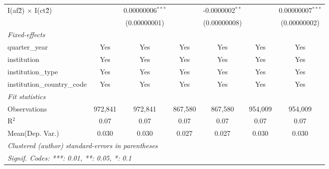 \begin{tabular}{lcccccc}
   I(af\^2) $\times$ I(ct\^2)         &               & 0.00000006$^{***}$ &                & -0.0000002$^{**}$ &               & 0.00000007$^{***}$\\   
                                      &               & (0.00000001)       &                & (0.00000008)      &               & (0.00000002)\\   
   \midrule
   \emph{Fixed-effects}\\
   quarter\_year                      & Yes           & Yes                & Yes            & Yes               & Yes           & Yes\\  
   institution                        & Yes           & Yes                & Yes            & Yes               & Yes           & Yes\\  
   institution\_type                  & Yes           & Yes                & Yes            & Yes               & Yes           & Yes\\  
   institution\_country\_code         & Yes           & Yes                & Yes            & Yes               & Yes           & Yes\\  
   \midrule
   \emph{Fit statistics}\\
   Observations                       & 972,841       & 972,841            & 867,580        & 867,580           & 954,009       & 954,009\\  
   R$^2$                              & 0.07          & 0.07               & 0.07           & 0.07              & 0.07          & 0.07\\  
Mean(Dep. Var.) & 0.030 & 0.030 & 0.027 & 0.027 & 0.030 & 0.030 \\
   \midrule \midrule
   \multicolumn{7}{l}{\emph{Clustered (author) standard-errors in parentheses}}\\
   \multicolumn{7}{l}{\emph{Signif. Codes: ***: 0.01, **: 0.05, *: 0.1}}\\
\end{tabular}
\par\endgroup
